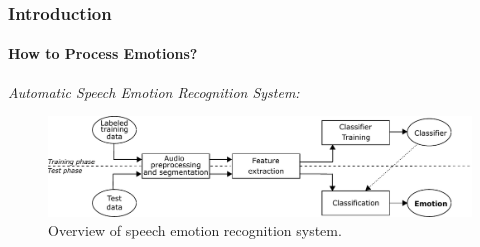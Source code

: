 \documentclass[10pt,usepdftitle=false,aspectratio=169]{beamer}
\begin{document}




\begin{frame}\frametitle{Introduction}
    \framesubtitle{How to Process Emotions?}
    


\vspace{2em}

\vspace{1em}
	\emph{Automatic Speech Emotion Recognition System:}
	\begin{figure}
	\includegraphics[width=\textwidth]{figures/EmotionRecognitionSystem.pdf}
	\caption{Overview of speech emotion recognition system.}
\end{figure}


	

\end{frame}








\end{document}
